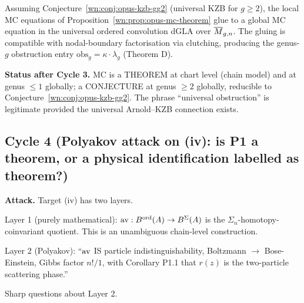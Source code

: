 \begin{conjecture}
\label{wn:conj:opus-mc-universal}\ClaimStatusConjectured
Assuming Conjecture~\ref{wn:conj:opus-kzb-gg2} (universal KZB for
$g \ge 2$), the local MC equations of
Proposition~\ref{wn:prop:opus-mc-theorem} glue to a global MC equation
in the universal ordered convolution dGLA over $\overline{M}_{g,n}$. The
gluing is compatible with nodal-boundary factorisation via clutching,
producing the genus-$g$ obstruction entry
$\mathrm{obs}_g = \kappa \cdot \lambda_g$ (Theorem D).
\end{conjecture}

\textbf{Status after Cycle 3.} MC is a THEOREM at chart level (chain
model) and at genus $\le 1$ globally; a CONJECTURE at genus $\ge 2$
globally, reducible to Conjecture~\ref{wn:conj:opus-kzb-gg2}. The
phrase ``universal obstruction'' is legitimate provided the universal
Arnold--KZB connection exists.

\subsection*{Cycle 4 (Polyakov attack on (iv): is P1 a theorem, or
a physical identification labelled as theorem?)}

\textbf{Attack.} Target (iv) has two layers.

Layer 1 (purely mathematical): $\mathrm{av}: B^{\mathrm{ord}}(A) \to B^{\Sigma}(A)$ is the
$\Sigma_n$-homotopy-coinvariant quotient. This is an unambiguous
chain-level construction.

Layer 2 (Polyakov): ``$\mathrm{av}$ IS particle indistinguishability, Boltzmann
$\to$ Bose-Einstein, Gibbs factor $n!/1$, with Corollary P1.1 that
$r(z)$ is the two-particle scattering phase.''

Sharp questions about Layer 2.

